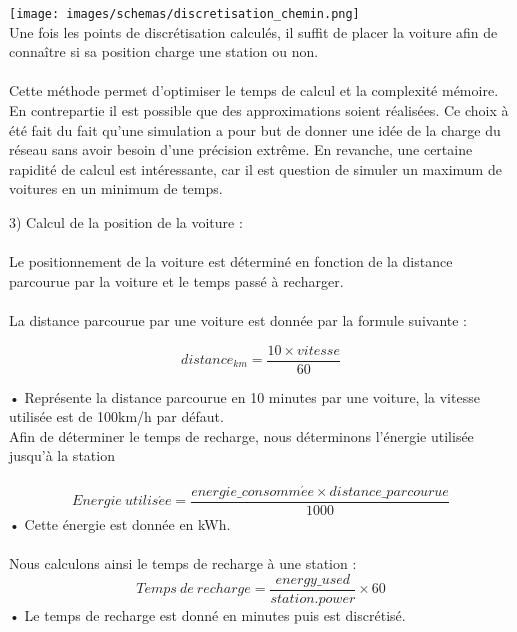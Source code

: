 \documentclass[12pt,titlepage]{report}
\begin{document}
\texttt{[image: images/schemas/discretisation\_chemin.png]}\\

Une fois les points de discrétisation calculés, il suffit de placer la voiture afin de connaître si sa position charge une station ou non.
\\ \\
Cette méthode permet d’optimiser le temps de calcul et la complexité mémoire. En contrepartie il est possible que des approximations soient réalisées. Ce choix à été fait du fait qu’une simulation a pour but de donner une idée de la charge du réseau sans avoir besoin d’une précision extrême. En revanche, une certaine rapidité de calcul est intéressante, car il est question de simuler un maximum de voitures en un minimum de temps.
\\ \par
3) Calcul de la position de la voiture :
\\ \\
Le positionnement de la voiture est déterminé en fonction de la distance parcourue par la voiture et le temps passé à recharger.
\\ \\
La distance parcourue par une voiture est donnée par la formule suivante :

\begin{equation}
distance_{km} = \frac{10 \times vitesse}{60}
\end{equation}

•	Représente la distance parcourue en 10 minutes par une voiture, la vitesse utilisée est de 100km/h par défaut.\\

Afin de déterminer le temps de recharge, nous déterminons l’énergie utilisée jusqu’à la station \\ \\
\begin{equation}
Energie\ utilis\acute{e}e = \frac{energie\_consomm\acute{e}e \times distance\_parcourue}{1000}
\end{equation}
•	Cette énergie est donnée en kWh.
\\ \\
Nous calculons ainsi le temps de recharge à une station :
\begin{equation}
Temps\ de\ recharge = \frac{energy\_used}{station.power} \times 60
\end{equation}
•	Le temps de recharge est donné en minutes puis est discrétisé.\\
\end{document}

